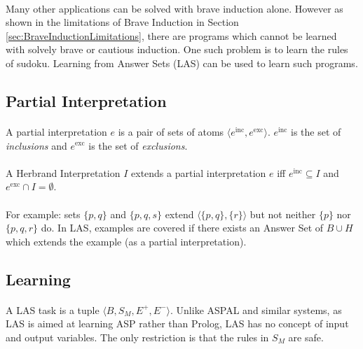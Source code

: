 \documentclass{article}
\theoremstyle{plain}
\theoremstyle{definition}
\begin{document}
\begin{multicols}{2}
\paragraph{} Many other applications can be solved with brave induction alone. However as shown in the limitations of Brave Induction in Section \ref{sec:BraveInductionLimitations}, there are programs which cannot be learned with solvely brave or cautious induction. One such problem is to learn the rules of sudoku. Learning from Answer Sets (LAS) can be used to learn such programs\cite{law14}.

\subsection{Partial Interpretation}

\paragraph{} A partial interpretation $e$ is a pair of sets of atoms $\langle e^\text{inc}, e^\text{exc}\rangle $. $e^\text{inc}$ is the set of \textit{inclusions} and $e^\text{exc}$ is the set of \textit{exclusions}.

\paragraph{} A Herbrand Interpretation $I$ extends a partial interpretation $e$ iff $e^\text{inc} \subseteq I$ and $e^\text{exc} \cap I = \emptyset$.

\paragraph{} For example: sets $\{p, q\}$ and $\{p, q, s\}$ extend $\langle \{p, q\}, \{r\} \rangle$ but not neither $\{p\}$ nor $\{p, q, r\}$ do. In LAS, examples are covered if there exists an Answer Set of $B \cup H$ which extends the example (as a partial interpretation).

\subsection{Learning}

\paragraph{} A LAS task is a tuple $\langle B, S_M, E^+, E^- \rangle$. Unlike ASPAL and similar systems, as LAS is aimed at learning ASP rather than Prolog, LAS has no concept of input and output variables. The only restriction is that the rules in $S_M$ are safe. 


\end{multicols}
\end{document}

